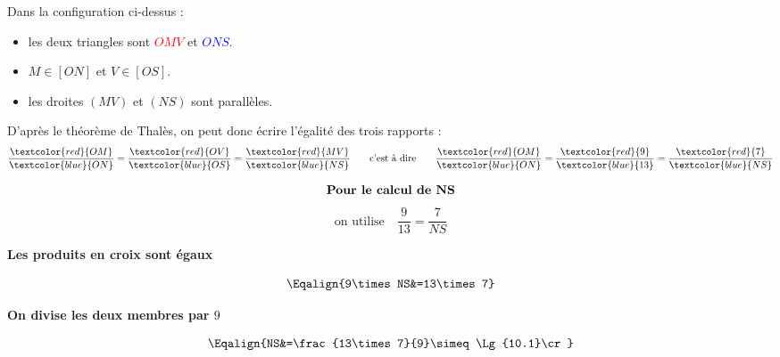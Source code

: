 \begin{methode*1}
            \correction
            Dans la configuration ci-dessus : 
            \begin{itemize}
                \item les deux triangles sont \textcolor{red}{$OMV$} et \textcolor{blue}{$ONS$}.
                \item $M \in [ON]$ et $V \in [OS]$.
                \item les droites $(MV)$ et $(NS)$ sont parallèles.                
            \end{itemize}
            D'après le théorème de Thalès, on peut donc écrire l'égalité des trois rapports :
            $$\frac{\textcolor{red}{OM}}{\textcolor{blue}{ON}}=\frac{\textcolor{red}{OV}}{\textcolor{blue}{OS}}=\frac{\textcolor{red}{MV}}{\textcolor{blue}{NS}}\qquad\mbox{c'est à dire}\qquad\frac{\textcolor{red}{OM}}{\textcolor{blue}{ON}}=\frac{\textcolor{red}{9}}{\textcolor{blue}{13}}=\frac{\textcolor{red}{7}}{\textcolor{blue}{NS}}$$

                $$\mbox{\bf Pour le calcul de NS}$$
                $$\mbox{on utilise} \quad \dfrac{9}{13}=\dfrac{7}{NS}$$
                \begin{center}
                    {\bf Les produits en croix sont égaux}
                \end{center}
                $$\Eqalign{9\times NS&=13\times7}$$
                \begin{center}
                    {\bf On divise les deux membres par $9$}
                \end{center}
                $$\Eqalign{NS&=\frac{13\times7}{9}\simeq\Lg{10.1}\cr}$$
        \end{methode*1}